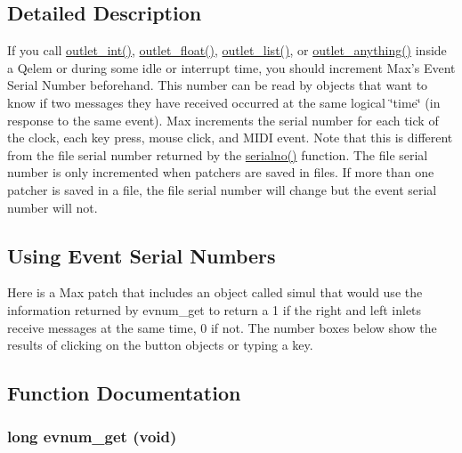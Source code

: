 \subsection{Detailed Description}
If you call \hyperlink{group__inout_ga0b2b38216f2f4dba486bfcd2273f255e}{outlet\_\-int()}, \hyperlink{group__inout_gafbb3f62a413f05a394391afde5b3c30f}{outlet\_\-float()}, \hyperlink{group__inout_gabdef4fbe6e1040dc28204b8070bdcda5}{outlet\_\-list()}, or \hyperlink{group__inout_ga12798ee897e01dac21ee547c4091d8a8}{outlet\_\-anything()} inside a Qelem or during some idle or interrupt time, you should increment Max’s Event Serial Number beforehand. This number can be read by objects that want to know if two messages they have received occurred at the same logical \char`\"{}time\char`\"{} (in response to the same event). Max increments the serial number for each tick of the clock, each key press, mouse click, and MIDI event. Note that this is different from the file serial number returned by the \hyperlink{group__evnum_ga7e7dac31c7f482fec5bf64bf61cdc26b}{serialno()} function. The file serial number is only incremented when patchers are saved in files. If more than one patcher is saved in a file, the file serial number will change but the event serial number will not.\hypertarget{group__evnum_using_event_serial_numbers}{}\subsection{Using Event Serial Numbers}\label{group__evnum_using_event_serial_numbers}
Here is a Max patch that includes an object called simul that would use the information returned by evnum\_\-get to return a 1 if the right and left inlets receive messages at the same time, 0 if not. The number boxes below show the results of clicking on the button objects or typing a key.

 

\subsection{Function Documentation}
\hypertarget{group__evnum_gad8e1d4214caa9159893347d0c1f6198e}{
\subsubsection[{evnum\_\-get}]{\setlength{\rightskip}{0pt plus 5cm}long evnum\_\-get (void)}}
\label{group__evnum_gad8e1d4214caa9159893347d0c1f6198e}


